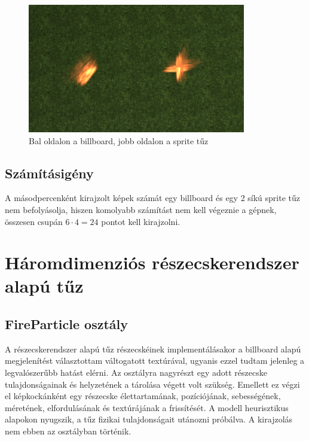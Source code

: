 \begin{figure}[h!]
 \centering
 \includegraphics[width=0.85\textwidth]{kepek/billboardFinal5.png}
 \caption{Bal oldalon a billboard, jobb oldalon a sprite tűz}
 \label{fig:billboardFinal5}
\end{figure}

\subsection{Számításigény}
A másodpercenként kirajzolt képek számát egy billboard és egy 2 síkú sprite tűz nem befolyásolja, hiszen komolyabb számítást nem kell végeznie a gépnek, összesen csupán $6 \cdot 4 = 24$ pontot kell kirajzolni.


\section{Háromdimenziós részecskerendszer alapú tűz}

\subsection{FireParticle osztály}

A részecskerendszer alapú tűz részecskéinek implementálásakor a billboard alapú megjelenítést választottam váltogatott textúrával, ugyanis ezzel tudtam jelenleg a legvalószerűbb hatást elérni. Az osztályra nagyrészt egy adott részecske tulajdonságainak és helyzetének a tárolása végett volt szükség. Emellett ez végzi el képkockánként egy részecske élettartamának, pozíciójának, sebességének, méretének, elfordulásának és textúrájának a frissítését. A modell heurisztikus alapokon nyugszik, a tűz fizikai tulajdonságait utánozni próbálva. A kirajzolás nem ebben az osztályban történik.

